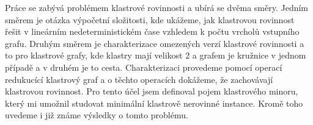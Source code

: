 Práce se zabývá problémem klastrové rovinnosti a ubírá se dvěma směry. Jedním směrem je otázka výpočetní složitosti, kde ukážeme, jak klastrovou rovinnost řešit v lineárním nedeterministickém čase vzhledem k počtu vrcholů vstupního grafu. Druhým směrem je charakterizace omezených verzí klastrové rovinnosti a to pro klastrové grafy, kde klastry mají velikost 2 a grafem je kružnice v jednom případě a v druhém je to cesta. Charakterizaci provedeme pomocí operací redukucící klastrový graf a o těchto operacích dokážeme, že zachovávají klastrovou rovinnost. Pro tento účel jsem definoval pojem klastrového minoru, který mi umožnil studovat minimální klastrově nerovinné instance. Kromě toho uvedeme i již známe výsledky o tomto problému.